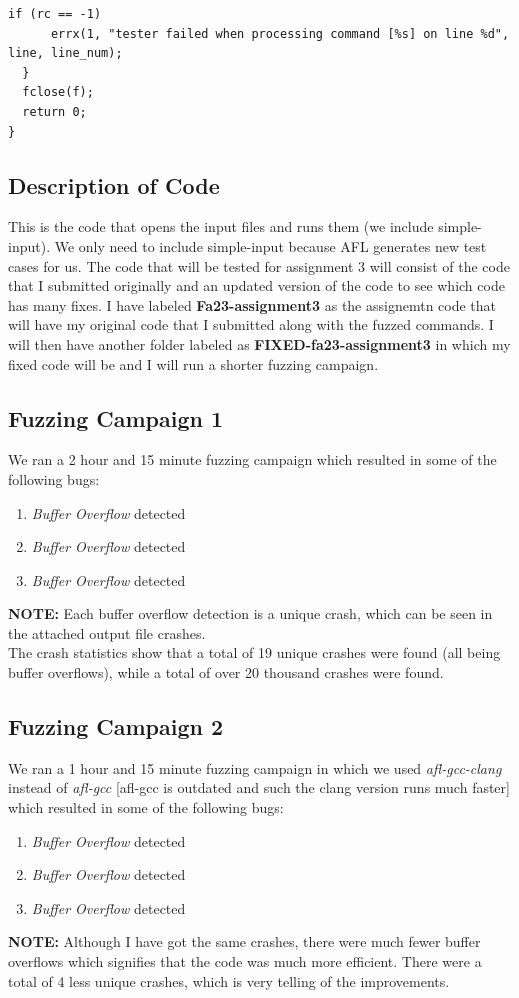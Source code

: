 \documentclass[11pt]{article}
\begin{document}
\begin{lstlisting}[style=CStyle]
    if (rc == -1)
      errx(1, "tester failed when processing command [%s] on line %d", line, line_num);
  }
  fclose(f);
  return 0;
}
\end{lstlisting}

\subsection{Description of Code}
This is the code that opens the input files and runs them (we include simple-input). We only need to include simple-input because AFL generates new test cases for us. The code that will be tested for assignment 3 will consist of the code that I submitted originally and an updated version of the code to see which code has many fixes. I have labeled  \textbf{Fa23-assignment3} as the assignemtn code that will have my original code that I submitted along with the fuzzed commands. I will then have another folder labeled as \textbf{FIXED-fa23-assignment3} in which my fixed code will be and I will run a shorter fuzzing campaign. 



\subsection{Fuzzing Campaign 1}
We ran a 2 hour and 15 minute fuzzing campaign which resulted in some of the following bugs:
\begin{enumerate}
    \item \textit{Buffer Overflow} detected
    \item \textit{Buffer Overflow} detected
    \item \textit{Buffer Overflow} detected
\end{enumerate}
\textbf{NOTE:} Each buffer overflow detection is a unique crash, which can be seen in the attached output file crashes. \\
The crash statistics show that a total of 19 unique crashes were found (all being buffer overflows), while a total of over 20 thousand crashes were found. 


\subsection{Fuzzing Campaign 2}
We ran a 1 hour and 15 minute fuzzing campaign in which we used \textit{afl-gcc-clang} instead of \textit{afl-gcc} [afl-gcc is outdated and such the clang version runs much faster] which resulted in some of the following bugs:
\begin{enumerate}
    \item \textit{Buffer Overflow} detected
    \item \textit{Buffer Overflow} detected
    \item \textit{Buffer Overflow} detected
\end{enumerate}
\textbf{NOTE:} Although I have got the same crashes, there were much fewer buffer overflows which signifies that the code was much more efficient. There were a total of 4 less unique crashes, which is very telling of the improvements. 
\end{document}
